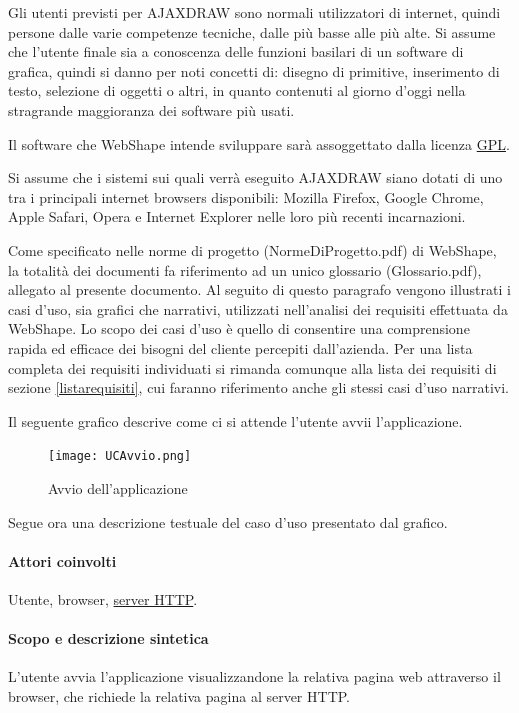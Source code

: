 \label{definizione_utente}
Gli utenti previsti per AJAXDRAW sono normali utilizzatori di internet, quindi persone dalle varie competenze tecniche, dalle pi\`u basse alle pi\`u alte. Si assume che l'utente finale sia a conoscenza delle funzioni basilari di un software di grafica, quindi si danno per noti concetti di: disegno di primitive, inserimento di testo, selezione di oggetti o altri, in quanto contenuti al giorno d'oggi nella stragrande maggioranza dei software pi\`u usati.

Il software che WebShape intende sviluppare sar\`a assoggettato dalla licenza \underline{GPL}.

Si assume che i sistemi sui quali verr\`a eseguito AJAXDRAW siano dotati di uno tra i principali internet browsers disponibili: Mozilla Firefox, Google Chrome, Apple Safari, Opera e Internet Explorer nelle loro pi\`u recenti incarnazioni.

Come specificato nelle norme di progetto (NormeDiProgetto.pdf) di WebShape, la totalit\` a dei documenti fa riferimento ad un unico glossario (Glossario.pdf), allegato al presente documento.
\newpage
{}
Al seguito di questo paragrafo vengono illustrati i casi d'uso, sia grafici che narrativi, utilizzati nell'analisi dei requisiti effettuata da WebShape. Lo scopo dei casi d'uso \`e quello di consentire una comprensione rapida ed efficace dei bisogni del cliente percepiti dall'azienda. Per una lista completa dei requisiti individuati si rimanda comunque alla lista dei requisiti di sezione \ref{listarequisiti}, cui faranno riferimento anche gli stessi casi d'uso narrativi.

Il seguente grafico descrive come ci si attende l'utente avvii l'applicazione.
\begin{figure}[!ht]
\centering
\texttt{[image: UCAvvio.png]}
\caption{Avvio dell'applicazione}
\end{figure}

Segue ora una descrizione testuale del caso d'uso presentato dal grafico.

\paragraph{Attori coinvolti} Utente, browser, {\underline{server HTTP}}.
\paragraph{Scopo e descrizione sintetica}
L'utente avvia l'applicazione visualizzandone la relativa pagina web attraverso il browser, che richiede la relativa pagina al server HTTP.
